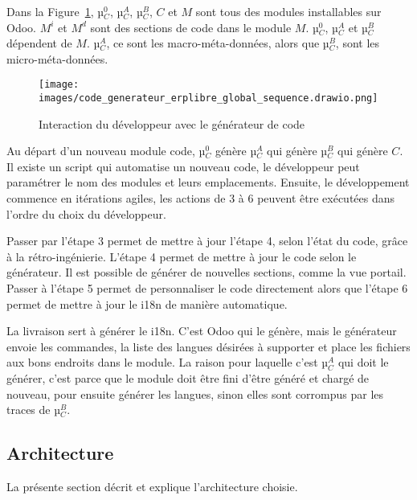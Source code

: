 Dans la Figure~\ref{fig:dia_sequence_gc}, µ$_C^0$, µ$_C^A$, µ$_C^B$, $C$ et $M$ sont tous des modules installables sur Odoo. $M^i$ et $M^d$ sont des sections de code dans le module $M$. µ$_C^0$, µ$_C^A$ et µ$_C^B$ dépendent de $M$. µ$_C^A$, ce sont les macro-méta-données, alors que µ$_C^B$, sont les micro-méta-données.

\begin{figure}
\centering
\texttt{[image: images/code\_generateur\_erplibre\_global\_sequence.drawio.png]}
\caption{Interaction du développeur avec le générateur de code}
\label{fig:dia_sequence_gc}
\end{figure}

Au départ d’un nouveau module code, µ$_C^0$ génère µ$_C^A$ qui génère µ$_C^B$ qui génère $C$. Il existe un script qui automatise un nouveau code, le développeur peut paramétrer le nom des modules et leurs emplacements. Ensuite, le développement commence en itérations agiles, les actions de 3 à 6 peuvent être exécutées dans l’ordre du choix du développeur.


Passer par l’étape 3 permet de mettre à jour l’étape 4, selon l’état du code, grâce à la rétro-ingénierie. L’étape 4 permet de mettre à jour le code selon le générateur. Il est possible de générer de nouvelles sections, comme la vue portail. Passer à l’étape 5 permet de personnaliser le code directement alors que l’étape 6 permet de mettre à jour le i18n de manière automatique.

La livraison sert à générer le i18n. C’est Odoo qui le génère, mais le générateur envoie les commandes, la liste des langues désirées à supporter et place les fichiers aux bons endroits dans le module. La raison pour laquelle c’est µ$_C^A$ qui doit le générer, c’est parce que le module doit être fini d’être généré et chargé de nouveau, pour ensuite générer les langues, sinon elles sont corrompus par les traces de µ$_C^B$.


\subsection{Architecture}\label{architecture_result}
La présente section décrit et explique l'architecture choisie.

